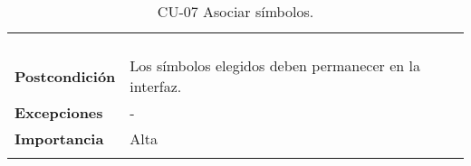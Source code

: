 \begin{longtable}[H]{@{}ll@{}}
\begin{minipage}[t]{0.71\columnwidth}
\begin{enumerate}
\end{enumerate}\strut
\end{minipage}\tabularnewline
\begin{minipage}[t]{0.23\columnwidth}\raggedright\strut
\textbf{Postcondición}\strut
\end{minipage} & \begin{minipage}[t]{0.71\columnwidth}\raggedright\strut
  Los símbolos elegidos deben permanecer en la interfaz.
\end{minipage}\tabularnewline
\begin{minipage}[t]{0.23\columnwidth}\raggedright\strut
\textbf{Excepciones}\strut
\end{minipage} & \begin{minipage}[t]{0.71\columnwidth}\raggedright\strut
-\strut
\end{minipage}\tabularnewline
\begin{minipage}[t]{0.23\columnwidth}\raggedright\strut
\textbf{Importancia}\strut
\end{minipage} & \begin{minipage}[t]{0.71\columnwidth}\raggedright\strut
Alta\strut
\end{minipage}\tabularnewline
\bottomrule
\caption{CU-07 Asociar símbolos.}
\end{longtable}

\strut
\\
\\
\\



\strut

